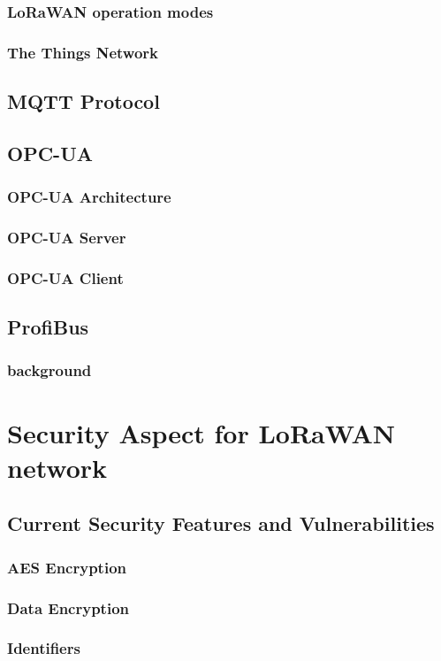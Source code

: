 \documentclass{book}
\begin{document}
\subsection{LoRaWAN operation modes}
\subsection{The Things Network}
\section{MQTT Protocol}
\section{OPC-UA}
\subsection{OPC-UA Architecture}
\subsection{OPC-UA Server}
\subsection{OPC-UA Client}
\section{ProfiBus}
\subsection{background}

\chapter{Security Aspect for LoRaWAN network}
\section{Current Security Features and Vulnerabilities}
\subsection{AES Encryption}
\subsection{Data Encryption}
\subsection{Identifiers}
\end{document}
